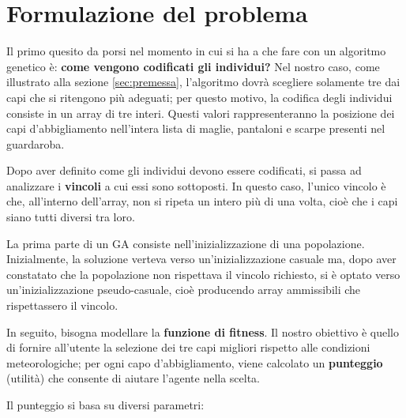 \documentclass[a4paper, 11pt, oneside]{report}
\begin{document}
            \newpage
            \section{Formulazione del problema}
            \label{sec:formulazione-problema-ga}
            Il primo quesito da porsi nel momento in cui si ha a che fare con un algoritmo genetico è: \textbf{come vengono
            codificati gli individui?} Nel nostro caso, come illustrato alla sezione \ref{sec:premessa}, l'algoritmo dovrà
            scegliere solamente tre dai capi che si ritengono più adeguati;
            per questo motivo, la codifica degli individui consiste in un array di tre interi.
            Questi valori rappresenteranno la posizione dei capi d'abbigliamento nell'intera lista di maglie, pantaloni
            e scarpe presenti nel guardaroba.
            \\
            \par \noindent Dopo aver definito come gli individui devono essere codificati, si passa ad analizzare i \textbf{vincoli} a
            cui essi sono sottoposti.
            In questo caso, l'unico vincolo è che, all'interno dell'array, non si ripeta un intero più di una volta,
            cioè che i capi siano tutti diversi tra loro.
            \\
            \par \noindent La prima parte di un GA consiste nell'inizializzazione di una popolazione.
            Inizialmente, la soluzione verteva verso un'inizializzazione casuale ma, dopo aver constatato che la popolazione non rispettava il vincolo richiesto,
            si è optato verso un'inizializzazione pseudo-casuale, cioè producendo array ammissibili che rispettassero il vincolo.
            \\
            \par \noindent In seguito, bisogna modellare la \textbf{funzione di fitness}.
            Il nostro obiettivo è quello di fornire all'utente la selezione dei tre capi migliori rispetto alle condizioni
            meteorologiche;
            per ogni capo d'abbigliamento, viene calcolato un \textbf{punteggio} (utilità) che consente di aiutare l'agente nella scelta.
            \\
            \par \noindent Il punteggio si basa su diversi parametri:
\end{document}
